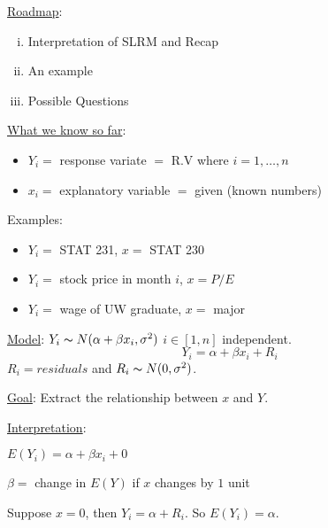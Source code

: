 \underline{Roadmap}:
\begin{enumerate}[(i)]
    \item Interpretation of SLRM and Recap
    \item An example
    \item Possible Questions
\end{enumerate}
\underline{What we know so far}:
\begin{itemize}
    \item $ Y_i = $ response variate $ = $ R.V where $ i=1,\ldots ,n $
    \item $ x_i = $ explanatory variable $ = $ given (known numbers)
\end{itemize}
Examples:
\begin{itemize}
    \item $ Y_i = $ STAT 231, $ x= $ STAT 230
    \item $ Y_i= $ stock price in month $ i $, $ x=P/E $
    \item $ Y_i= $ wage of UW graduate, $ x= $ major
\end{itemize}

\underline{Model}: $ Y_i  \thicksim N(\alpha+\beta x_i, \sigma^2) $ $ i\in[1,n] $ independent.
\[ Y_i=\alpha+\beta x_i+R_i \]
$ R_i = residuals $ and $ R_i \thicksim N(0,\sigma^2) $.

\underline{Goal}: Extract the relationship between $ x $ and $ Y $.

\underline{Interpretation}:

$ E(Y_i)=\alpha+\beta x_i+0 $

$ \beta = $ change in $ E(Y) $ if $ x $ changes by $ 1 $ unit

Suppose $ x=0 $, then $ Y_i=\alpha+R_i $. So $ E(Y_i)=\alpha $.

